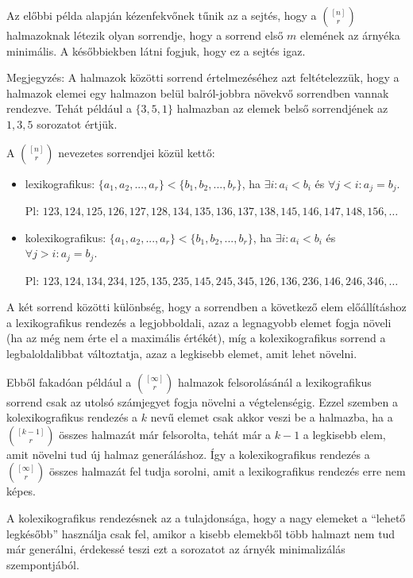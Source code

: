\begin{obs}
  Az előbbi példa alapján kézenfekvőnek tűnik az a sejtés, hogy a $\binom{[n]}{r}$ halmazoknak létezik olyan sorrendje, hogy a sorrend első $m$ elemének az árnyéka minimális. A későbbiekben látni fogjuk, hogy ez a sejtés igaz.
\end{obs}

Megjegyzés: A halmazok közötti sorrend értelmezéséhez azt feltételezzük, hogy a halmazok elemei egy halmazon belül balról-jobbra növekvő sorrendben vannak rendezve. Tehát például a $\{3, 5, 1\}$ halmazban az elemek belső sorrendjének az $1, 3, 5$ sorozatot értjük.

\vspace{1em}

\noindent A $\binom{[n]}{r}$ nevezetes sorrendjei közül kettő:
\begin{itemize}
  \item lexikografikus:\hphantom{ko} $\{a_1, a_2, ..., a_r\} < \{b_1, b_2, ..., b_r\}$, ha $\exists i: a_i < b_i$ és $\forall j < i: a_j = b_j$.

  Pl: $123, 124, 125, 126, 127, 128, 134, 135, 136, 137, 138, 145, 146, 147, 148, 156, \dots$

  \item kolexikografikus: $\{a_1, a_2, ..., a_r\} < \{b_1, b_2, ..., b_r\}$, ha $\exists i: a_i < b_i$ és $\forall j > i: a_j = b_j$.

  Pl: $123, 124, 134, 234, 125, 135, 235, 145, 245, 345, 126, 136, 236, 146, 246, 346, \dots$
\end{itemize}

A két sorrend közötti különbség, hogy a sorrendben a következő elem előállításhoz a lexikografikus rendezés a legjobboldali, azaz a legnagyobb elemet fogja növeli (ha az még nem érte el a maximális értékét), míg a kolexikografikus sorrend a legbaloldalibbat változtatja, azaz a legkisebb elemet, amit lehet növelni.

Ebből fakadóan például a $\binom{[\infty]}{r}$ halmazok felsorolásánál a lexikografikus sorrend csak az utolsó számjegyet fogja növelni a végtelenségig. Ezzel szemben a kolexikografikus rendezés a $k$ nevű elemet csak akkor veszi be a halmazba, ha a $\binom{[k-1]}{r}$ összes halmazát már felsorolta, tehát már a $k-1$ a legkisebb elem, amit növelni tud új halmaz generáláshoz. Így a kolexikografikus rendezés a $\binom{[\infty]}{r}$ összes halmazát fel tudja sorolni, amit a lexikografikus rendezés erre nem képes.

A kolexikografikus rendezésnek az a tulajdonsága, hogy a nagy elemeket a ``lehető legkésőbb'' használja csak fel, amikor a kisebb elemekből több halmazt nem tud már generálni, érdekessé teszi ezt a sorozatot az árnyék minimalizálás szempontjából.

